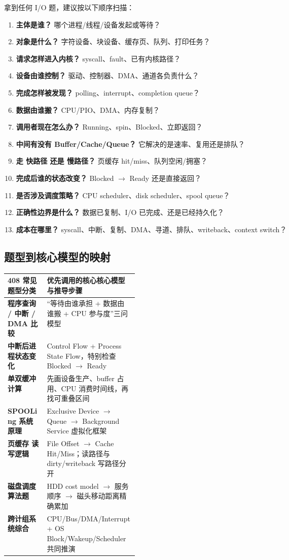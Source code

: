 \documentclass[UTF8,fontset=fandol,11pt,a4paper]{ctexart}
\newcommand{\kw}[1]{\textbf{#1}}
\begin{document}
\begin{method}[I/O 十三问]
拿到任何 I/O 题，建议按以下顺序扫描：
\begin{enumerate}
  \item \kw{主体是谁？} 哪个进程/线程/设备发起或等待？
  \item \kw{对象是什么？} 字符设备、块设备、缓存页、队列、打印任务？
  \item \kw{请求怎样进入内核？} syscall、fault、已有内核路径？
  \item \kw{设备由谁控制？} 驱动、控制器、DMA、通道各负责什么？
  \item \kw{完成怎样被发现？} polling、interrupt、completion queue？
  \item \kw{数据由谁搬？} CPU/PIO、DMA、内存复制？
  \item \kw{调用者现在怎么办？} Running、spin、Blocked、立即返回？
  \item \kw{中间有没有 Buffer/Cache/Queue？} 它解决的是速率、复用还是排队？
  \item \kw{走 快路径 还是 慢路径？} 页缓存 hit/miss、队列空闲/拥塞？
  \item \kw{完成后谁的状态改变？} Blocked $\to$ Ready 还是直接返回？
  \item \kw{是否涉及调度策略？} CPU scheduler、disk scheduler、spool queue？
  \item \kw{正确性边界是什么？} 数据已复制、I/O 已完成、还是已经持久化？
  \item \kw{成本在哪里？} syscall、中断、复制、DMA、寻道、排队、writeback、context switch？
\end{enumerate}
\end{method}

\subsection{题型到核心模型的映射}
\begingroup
\small
\renewcommand{\arraystretch}{1.25}
\setlength{\tabcolsep}{6pt}
\begin{tabularx}{\linewidth}{>{\bfseries}p{0.3\linewidth} X}
\toprule
408 常见题型分类 & 优先调用的核心核心模型与推导步骤 \\
\midrule
程序查询 / 中断 / DMA 比较 & “等待由谁承担 + 数据由谁搬 + CPU 参与度”三问模型 \\
中断后进程状态变化 & Control Flow + Process State Flow，特别检查 Blocked $\rightarrow$ Ready \\
单双缓冲计算 & 先画设备生产、buffer 占用、CPU 消费时间线，再找可重叠区间 \\
SPOOLing 系统原理 & Exclusive Device $\to$ Queue $\to$ Background Service 虚拟化框架 \\
页缓存 读写逻辑 & File Offset $\to$ Cache Hit/Miss；读路径与 dirty/writeback 写路径分开 \\
磁盘调度算法题 & HDD cost model $\to$ 服务顺序 $\to$ 磁头移动距离精确累加 \\
跨计组系统综合 & CPU/Bus/DMA/Interrupt + OS Block/Wakeup/Scheduler 共同推演 \\
\bottomrule
\end{tabularx}
\endgroup
\end{document}
